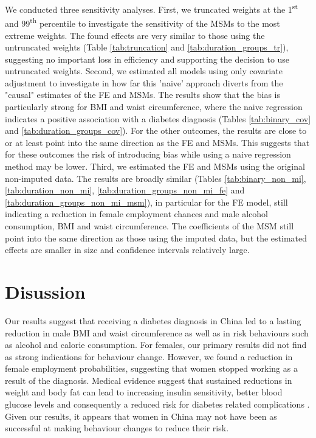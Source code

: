 We conducted three sensitivity analyses. First, we truncated weights at the 1\textsuperscript{st} and 99\textsuperscript{th} percentile to investigate the sensitivity of the \acp{MSM} to the most extreme weights. The found effects are very similar to those using the untruncated weights (Table \ref{tab:truncation} and \ref{tab:duration_groups_tr}), suggesting no important loss in efficiency and supporting the decision to use untruncated weights. Second, we estimated all models using only covariate adjustment to investigate in how far this 'naive' approach diverts from the "causal" estimates of the \ac{FE} and \acp{MSM}. The results show that the bias is particularly strong for \ac{BMI} and waist circumference, where the naive regression indicates a positive association with a diabetes diagnosis (Tables \ref{tab:binary_cov} and \ref{tab:duration_groups_cov}). For the other outcomes, the results are close to or at least point into the same direction as the \ac{FE} and \acp{MSM}. This suggests that for these outcomes the risk of introducing bias while using a naive regression method may be lower. Third, we estimated the \ac{FE} and \acp{MSM} using the original non-imputed data. The results are broadly similar (Tables \ref{tab:binary_non_mi}, \ref{tab:duration_non_mi}, \ref{tab:duration_groups_non_mi_fe} and \ref{tab:duration_groups_non_mi_msm}), in particular for the \ac{FE} model, still indicating a reduction in female employment chances and male alcohol consumption, \ac{BMI} and waist circumference. The coefficients of the \ac{MSM} still point into the same direction as those using the imputed data, but the estimated effects are smaller in size and confidence intervals relatively large.


\FloatBarrier


\section{\label{sec:Discussion5}Disussion}

Our results suggest that receiving a diabetes diagnosis in China led to a lasting reduction in male \ac{BMI} and waist circumference as well as in risk behaviours such as alcohol and calorie consumption. For females, our primary results did not find as strong indications for behaviour change. However, we found a reduction in female employment probabilities, suggesting that women stopped working as a result of the diagnosis.
Medical evidence suggest that sustained reductions in weight and body fat can lead to increasing insulin sensitivity, better blood glucose levels and consequently a reduced risk for diabetes related complications \parencite{Long2014,Zhou2016}. Given our results, it appears that women in China may not have been as successful at making behaviour changes to reduce their risk.

